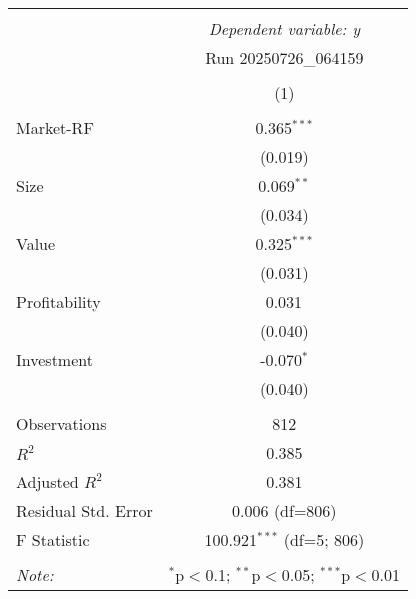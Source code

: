 \begin{table}[!htbp] \centering
\begin{tabular}{@{\extracolsep{5pt}}lc}
\\[-1.8ex]\hline
\hline \\[-1.8ex]
& \multicolumn{1}{c}{\textit{Dependent variable: y}} \
\cr \cline{2-2}
\\[-1.8ex] & \multicolumn{1}{c}{Run 20250726_064159}  \\
\\[-1.8ex] & (1) \\
\hline \\[-1.8ex]
 Market-RF & 0.365$^{***}$ \\
& (0.019) \\
 Size & 0.069$^{**}$ \\
& (0.034) \\
 Value & 0.325$^{***}$ \\
& (0.031) \\
 Profitability & 0.031$^{}$ \\
& (0.040) \\
 Investment & -0.070$^{*}$ \\
& (0.040) \\
\hline \\[-1.8ex]
 Observations & 812 \\
 $R^2$ & 0.385 \\
 Adjusted $R^2$ & 0.381 \\
 Residual Std. Error & 0.006 (df=806) \\
 F Statistic & 100.921$^{***}$ (df=5; 806) \\
\hline
\hline \\[-1.8ex]
\textit{Note:} & \multicolumn{1}{r}{$^{*}$p$<$0.1; $^{**}$p$<$0.05; $^{***}$p$<$0.01} \\
\end{tabular}
\end{table}